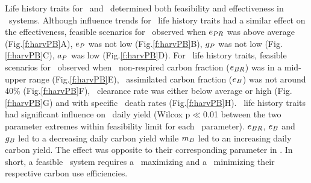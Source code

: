 \documentclass[../thesis.tex]{subfiles} %
\begin{document}
Life history traits for \phy\ and \bac\ determined both feasibility and effectiveness in \PBH\ systems.  Although influence trends for \phy\ life history traits had a similar effect on the effectiveness, feasible scenarios for \PBH\ observed when $e_{PR}$ was above average (Fig.\ref{f:harvPB}A), $e_P$ was not low (Fig.\ref{f:harvPB}B), $g_P$ was not low (Fig.\ref{f:harvPB}C), $a_P$ was low (Fig.\ref{f:harvPB}D).  For \bac\ life history traits, feasible scenarios for \PBH\ observed when \bac\ non-respired carbon fraction ($e_{BR}$) was in a mid-upper range (Fig.\ref{f:harvPB}E), \bac\ assimilated carbon fraction ($e_B$) was not around 40\% (Fig.\ref{f:harvPB}F), \bac\ clearance rate was either below average or high (Fig.\ref{f:harvPB}G) and with specific \bac\ death rates (Fig.\ref{f:harvPB}H).  \Bac\ life history traits had significant influence on \PBH\ daily yield (Wilcox p$\ll$0.01 between the two parameter extremes within feasibility limit for each \bac\ parameter).  $e_{BR}$, $e_B$ and $g_B$ led to a decreasing daily carbon yield while $m_B$ led to an increasing daily carbon yield.  The effect was opposite to their corresponding parameter in \phy.  In short, a feasible \PBH\ system requires a \phy\ maximizing and a \bac\ minimizing their respective carbon use efficiencies.
\end{document}
